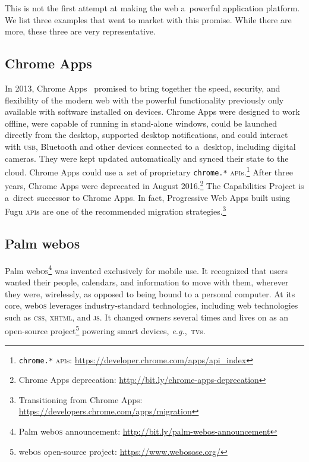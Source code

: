 \documentclass[sigconf]{acmart}
\begin{document}
This is not the first attempt at making the web a~powerful application platform.
We list three examples that went to market with this promise.
While there are more, these three are very representative.

\subsection{Chrome Apps}

In 2013, Chrome Apps~\cite{kay13} promised to bring together the speed, security,
and flexibility of the modern web with the powerful functionality
previously only available with software installed on devices. 
Chrome Apps were designed to work offline, were capable of running in stand-alone windows,
could be launched directly from the desktop,
supported desktop notifications,
and could interact with \textsc{usb}, Bluetooth and other devices connected to a~desktop,
including digital cameras.
They were kept updated automatically and synced their state to the cloud.
Chrome Apps could use a~set of proprietary \texttt{chrome.*}
\textsc{api}s.\footnote{\texttt{chrome.*}
\textsc{api}s: \url{https://developer.chrome.com/apps/api_index}}
After three years, Chrome Apps were deprecated in August
2016.\footnote{Chrome Apps deprecation:
\url{http://bit.ly/chrome-apps-deprecation}}
The Capabilities Project is a~direct successor to Chrome Apps.
In fact, Progressive Web Apps built using Fugu \textsc{api}s
are one of the recommended migration
strategies.\footnote{Transitioning from Chrome Apps: \url{https://developers.chrome.com/apps/migration}}

\subsection{Palm web\textsc{os}}

Palm web\textsc{os}\footnote{Palm web\textsc{os} announcement:
\url{http://bit.ly/palm-webos-announcement}}
was invented exclusively for mobile use.
It recognized that users wanted their people, calendars, and information to move with them,
wherever they were, wirelessly, as opposed to being bound to a personal computer.
At its core, web\textsc{os} leverages industry-standard technologies,
including web technologies such as \textsc{css}, \textsc{xhtml}, and \textsc{js}.
It changed owners several times and lives on as an open-source
project\footnote{web\textsc{os} open-source project: \url{https://www.webosose.org/}}
powering smart devices, \textit{e.g.},\ \textsc{tv}s.
\end{document}
